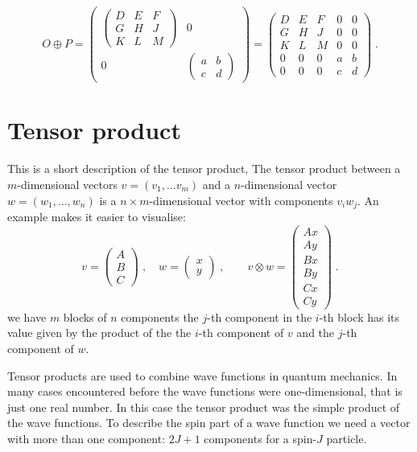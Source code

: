 \documentclass[12pt]{article}
\begin{document}
\[O\oplus P=
\left(\begin{array}{cc}
\left(\begin{array}{ccc}
D&E&F\\
G&H&J\\
K&L&M
\end{array}\right)
&0
\\
0&
\left(\begin{array}{cc}
a&b\\
c&d
\end{array}\right)
\end{array}\right)
=\left(\begin{array}{ccccc}
D&E&F&0&0\\
G&H&J&0&0\\
K&L&M&0&0\\
0&0&0&a&b\\
0&0&0&c&d
\end{array}\right)\;.
\]  

\section{Tensor product}
This is a short description of the tensor product,  
The tensor product between a $m$-dimensional vectors $v=(v_1,\dots v_m)$ and a $n$-dimensional vector $w=(w_1,\dots,w_n)$  is a $n\times m$-dimensional vector with components $v_i w_j$. An example makes it easier to visualise:
\[
v=\left(\begin{array}{c}A\\B\\C\end{array}\right)\;,\quad
w=\left(\begin{array}{c}x\\y\end{array}\right)\;,\qquad
v\otimes w=\left(\begin{array}{c}Ax\\Ay\\Bx\\By\\Cx\\Cy\end{array}\right)\;.
\] 
we have $m$ blocks of $n$ components the $j$-th component in the $i$-th block has its value given by the product of the the $i$-th component of $v$ and the $j$-th component of $w$. 

Tensor products are used to combine wave functions in quantum mechanics. In many cases encountered before the wave functions were one-dimensional, that is just one real number. In this case the tensor product was the simple product of the wave functions. To describe the spin part of a wave function we need a vector with more than one component: $2J+1$ components for a spin-$J$ particle.
\end{document}
